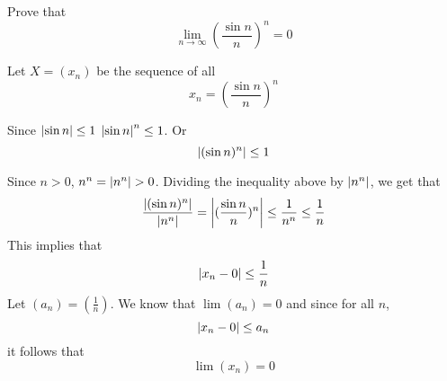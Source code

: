 \documentclass[boxes, qed]{homework}
\DeclarePairedDelimiter\abs{\lvert}{\rvert}%
\begin{document}
\newenvironment{amatrix}[1]{%
  \left[\begin{array}{@{}*{#1}{c}|c@{}}
}{%
  \end{array}\right]
}

\newenvironment{augmatrix}[1]{%
  \left[\begin{array}{#1}
}{%
  \end{array}\right]
}

\begin{problem}Prove that
  $$\lim_{n\rightarrow\infty}(\frac{\sin{n}}{n})^n=0$$
\end{problem}
\begin{solution}Let $X=(x_n)$ be the sequence of all 
  $$x_n=(\frac{\sin{n}}{n})^n$$
  
  Since $\abs*{\sin{n}}\le{1}$
  $\abs*{\sin{n}}^n\le{1}$. Or
  $$\abs*{(\sin{n})^n}\le{1}$$

  Since $n>{0}$,
  $n^n=\abs*{n^n}>{0}$.
  Dividing the inequality above by $\abs*{n^n}$, 
  we get that
  $$
  \frac{\abs*{(\sin{n})^n}}{\abs*{n^n}}
  =\abs*{(\frac{\sin{n}}{n})^n}
  \le{\frac{1}{n^n}}
  \le{\frac{1}{n}}
  $$
  This implies that
  $$
    \abs{x_n-0}
    \le{\frac{1}{n}}
  $$
  Let $(a_n)=(\frac{1}{n})$. We know that $\lim(a_n)=0$
  and since for all $n$,
  $$
    \abs{x_n-0}
    \le{a_n}
  $$
  it follows that
  $$
    \lim(x_n) = 0
  $$
\end{solution}
\end{document}
